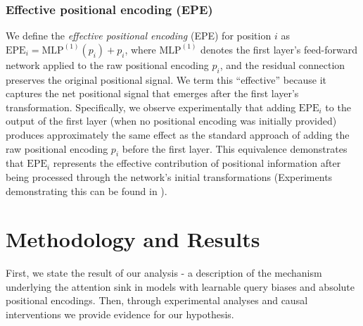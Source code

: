 \documentclass[11pt]{article}
\begin{document}
\subsubsection{Effective positional encoding (EPE)}
We define the \emph{effective positional encoding} (EPE) for position $i$ as $\mathrm{EPE}_i = \mathrm{MLP}^{(1)}(p_i) + p_i$, where $\mathrm{MLP}^{(1)}$ denotes the first layer's feed-forward network applied to the raw positional encoding $p_i$, and the residual connection preserves the original positional signal.  We term this ``effective'' because it captures the net positional signal that emerges after the first layer's transformation. Specifically, we observe experimentally that adding $\mathrm{EPE}_i$ to the output of the first layer (when no positional encoding was initially provided) produces approximately the same effect as the standard approach of adding the raw positional encoding $p_i$ before the first layer. This equivalence demonstrates that $\mathrm{EPE}_i$ represents the effective contribution of positional information after being processed through the network's initial transformations (Experiments demonstrating this can be found in \label{app:epe_exp}).

\section{Methodology and Results}
First, we state the result of our analysis - a description of the mechanism underlying the attention sink in models with learnable query biases and absolute positional encodings. Then, through experimental analyses and causal interventions we provide evidence for our hypothesis.
\end{document}
